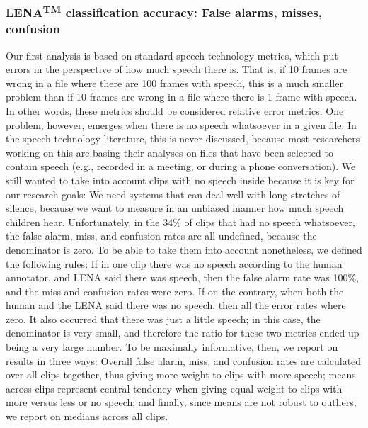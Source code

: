 \documentclass[english,table,man,floatsintext]{apa6}
\begin{document}
\hypertarget{lenatm-classification-accuracy-false-alarms-misses-confusion}{%
\subsubsection{\texorpdfstring{LENA\textsuperscript{TM} classification accuracy: False alarms, misses, confusion}{LENATM classification accuracy: False alarms, misses, confusion}}\label{lenatm-classification-accuracy-false-alarms-misses-confusion}}

Our first analysis is based on standard speech technology metrics, which put errors in the perspective of how much speech there is. That is, if 10 frames are wrong in a file where there are 100 frames with speech, this is a much smaller problem than if 10 frames are wrong in a file where there is 1 frame with speech. In other words, these metrics should be considered relative error metrics. One problem, however, emerges when there is no speech whatsoever in a given file. In the speech technology literature, this is never discussed, because most researchers working on this are basing their analyses on files that have been selected to contain speech (e.g., recorded in a meeting, or during a phone conversation). We still wanted to take into account clips with no speech inside because it is key for our research goals: We need systems that can deal well with long stretches of silence, because we want to measure in an unbiased manner how much speech children hear. Unfortunately, in the 34\% of clips that had no speech whatsoever, the false alarm, miss, and confusion rates are all undefined, because the denominator is zero. To be able to take them into account nonetheless, we defined the following rules: If in one clip there was no speech according to the human annotator, and LENA said there was speech, then the false alarm rate was 100\%, and the miss and confusion rates were zero. If on the contrary, when both the human and the LENA said there was no speech, then all the error rates where zero. It also occurred that there was just a little speech; in this case, the denominator is very small, and therefore the ratio for these two metrics ended up being a very large number. To be maximally informative, then, we report on results in three ways: Overall false alarm, miss, and confusion rates are calculated over all clips together, thus giving more weight to clips with more speech; means across clips represent central tendency when giving equal weight to clips with more versus less or no speech; and finally, since means are not robust to outliers, we report on medians across all clips.
\end{document}
